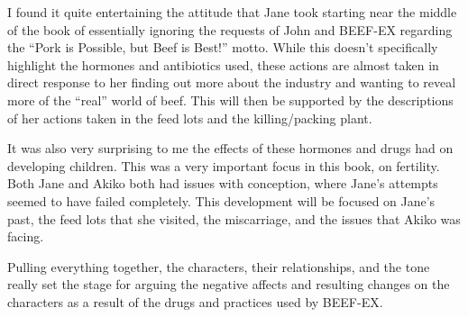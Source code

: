 \documentclass{article}
\begin{document}
I found it quite entertaining the attitude that Jane took starting near the
middle of the book of essentially ignoring the requests of John and BEEF-EX
regarding the ``Pork is Possible, but Beef is Best!'' \cite{ozeki1998my}
motto. While this doesn't specifically highlight the hormones and
antibiotics used, these actions are almost taken in direct response to her
finding out more about the industry and wanting to reveal more of the
``real'' world of beef. This will then be supported by the descriptions of
her actions taken in the feed lots and the killing/packing plant.

It was also very surprising to me the effects of these hormones and drugs
had on developing children. This was a very important focus in this book, on
fertility. Both Jane and Akiko both had issues with conception, where Jane's
attempts seemed to have failed completely. This development will be focused
on Jane's past, the feed lots that she visited, the miscarriage, and the
issues that Akiko was facing.

Pulling everything together, the characters, their relationships, and the
tone really set the stage for arguing the negative affects and resulting
changes on the characters as a result of the drugs and practices used by
BEEF-EX.
\makeworkscited
\end{document}
